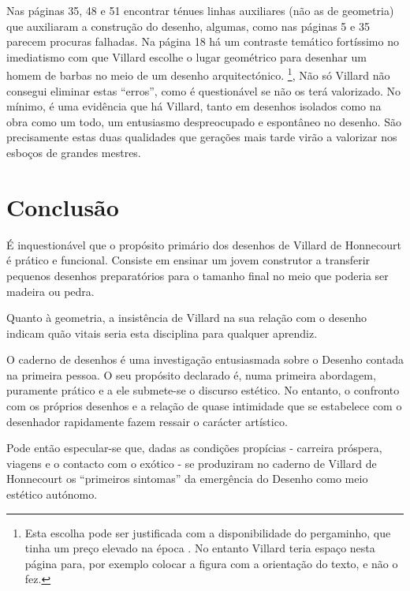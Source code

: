 \documentclass{article}
\begin{document}
Nas páginas 35, 48 e 51 encontrar ténues linhas auxiliares (não as de
geometria) que auxiliaram a construção do desenho, algumas, como nas
páginas 5 e 35 parecem procuras falhadas. Na página 18 há um contraste
temático fortíssimo no imediatismo com que Villard escolhe o lugar
geométrico para desenhar um homem de barbas no meio de um desenho
arquitectónico. \cite[p. 18]{villard}\footnote{Esta escolha pode ser
  justificada com a disponibilidade do pergaminho, que tinha um preço
  elevado na época \cite{calado}. No entanto Villard teria espaço
  nesta página para, por exemplo colocar a figura com a orientação do
  texto, e não o fez.}, Não só Villard não consegui eliminar estas
``erros'', como é questionável se não os terá valorizado. No mínimo, é
uma evidência que há Villard, tanto em desenhos isolados como na obra
como um todo, um entusiasmo despreocupado e espontâneo no desenho. São
precisamente estas duas qualidades que gerações mais tarde virão a
valorizar nos esboços de grandes mestres.

\section{Conclusão}

É inquestionável que o propósito primário dos desenhos de Villard de
Honnecourt é prático e funcional. Consiste em ensinar um jovem
construtor a transferir pequenos desenhos preparatórios para o tamanho
final no meio que poderia ser madeira ou pedra.

Quanto à geometria, a insistência de Villard na sua relação com o
desenho indicam quão vitais seria esta disciplina para qualquer
aprendiz.

O caderno de desenhos é uma investigação entusiasmada sobre o Desenho
contada na primeira pessoa. O seu propósito declarado é, numa primeira
abordagem, puramente prático e a ele submete-se o discurso
estético. No entanto, o confronto com os próprios desenhos e a relação
de quase intimidade que se estabelece com o desenhador rapidamente
fazem ressair o carácter artístico.

Pode então especular-se que, dadas as condições propícias - carreira
próspera, viagens e o contacto com o exótico - se produziram no
caderno de Villard de Honnecourt os ``primeiros sintomas'' da
emergência do Desenho como meio estético autónomo.

\printbibliography[heading=bibliography,title={Bibliografia},type=book]
\end{document}
